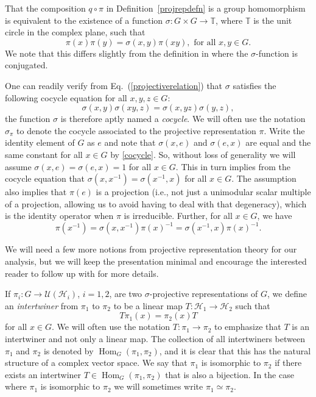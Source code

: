 \documentclass[11pt]{article}
\theoremstyle{definition}
\newcommand{\bbT}{\mathbb{T}}
\newcommand{\calH}{\mathcal{H}}
\newcommand{\calU}{\mathcal{U}}
\newcommand{\Hom}{\operatorname{Hom}}
\begin{document}
That the composition $q \circ \pi$ in Definition~\ref{projrepdefn} is a group homomorphism is equivalent to the existence of a function $\sigma \colon G \times G \to \bbT$, where $\bbT$ is the unit circle in the complex plane, such that
\begin{equation}\label{projectiverelation}
    \pi(x)\pi(y) = \sigma(x,y)\pi(xy), \text{ for all } x,y \in G.
\end{equation}
We note that this differs slightly from the definition in \cite{CeccheriniSilbersteinTullio22} where the $\sigma$-function is conjugated. 

One can readily verify from Eq.~(\ref{projectiverelation}) that $\sigma$ satisfies the following cocycle equation for all $x,y,z \in G$:
\begin{equation}\label{cocycle}
    \sigma(x,y)\sigma(xy,z) = \sigma(x,yz)\sigma(y,z),
\end{equation}
the function $\sigma$ is therefore aptly named a \emph{cocycle}. We will often use the notation $\sigma_\pi$ to denote the cocycle associated to the projective representation $\pi$. Write the identity element of $G$ as $e$ and note that $\sigma(x,e)$ and $\sigma(e,x)$ are equal and the same constant for all $x\in G$ by \eqref{cocycle}. So, without loss of generality we will assume $\sigma(x,e) = \sigma(e,x) = 1$ for all $x\in G$. This in turn implies from the cocycle equation that $\sigma(x,x^{-1}) = \sigma(x^{-1}, x)$ for all $x\in G$. The assumption also implies that $\pi(e)$ is a projection (i.e., not just a unimodular scalar multiple of a projection, allowing us to avoid having to deal with that degeneracy), which is the identity operator when $\pi$ is irreducible. Further, for all $x\in G$, we have 
\begin{equation}\label{inverse}
\pi(x^{-1}) = \sigma(x,x^{-1}) \pi(x)^{-1} = \sigma(x^{-1}, x) \pi(x)^{-1}.
\end{equation}

We will need a few more notions from projective representation theory for our analysis, but we will keep the presentation minimal and encourage the interested reader to follow up with \cite{CeccheriniSilbersteinTullio22,Eidesen2025} for more details. 

If $\pi_i \colon G \to \calU(\calH_i)$, $i = 1,2$, are two $\sigma$-projective representations of $G$, we define an \emph{intertwiner} from $\pi_1$ to $\pi_2$ to be a linear map $T \colon \calH_1 \to \calH_2$ such that 
\[
    T\pi_1(x) = \pi_2(x)T
\]
for all $x \in G$. We will often use the notation $T \colon \pi_1 \to \pi_2$ to emphasize that $T$ is an intertwiner and not only a linear map. The collection of all intertwiners between $\pi_1$ and $\pi_2$ is denoted by $\Hom_G(\pi_1,\pi_2)$, and it is clear that this has the natural structure of a complex vector space. We say that $\pi_1$ is isomorphic to $\pi_2$ if there exists an intertwiner $T \in \Hom_G(\pi_1,\pi_2)$ that is also a bijection. In the case where $\pi_1$ is isomorphic to $\pi_2$ we will sometimes write $\pi_1 \simeq \pi_2$.
\end{document}
